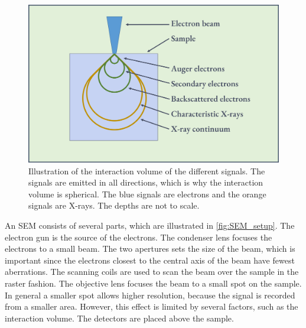 

\begin{figure}[ht]
    \centering
    \includegraphics[width=0.8\linewidth]{figures/interaction_volume.png}
    \caption{
        Illustration of the interaction volume of the different signals.
        The signals are emitted in all directions, which is why the interaction volume is spherical.
        The blue signals are electrons and the orange signals are X-rays.
        The depths are not to scale.
    }
    \label{fig:interaction_volume}
\end{figure}




An SEM consists of several parts, which are illustrated in \cref{fig:SEM_setup}.
The electron gun is the source of the electrons.
The condenser lens focuses the electrons to a small beam.
The two apertures sets the size of the beam, which is important since the electrons closest to the central axis of the beam have fewest aberrations.
The scanning coils are used to scan the beam over the sample in the raster fashion.
The objective lens focuses the beam to a small spot on the sample.
In general a smaller spot allows higher resolution, because the signal is recorded from a smaller area.
However, this effect is limited by several factors, such as the interaction volume.
The detectors are placed above the sample.


